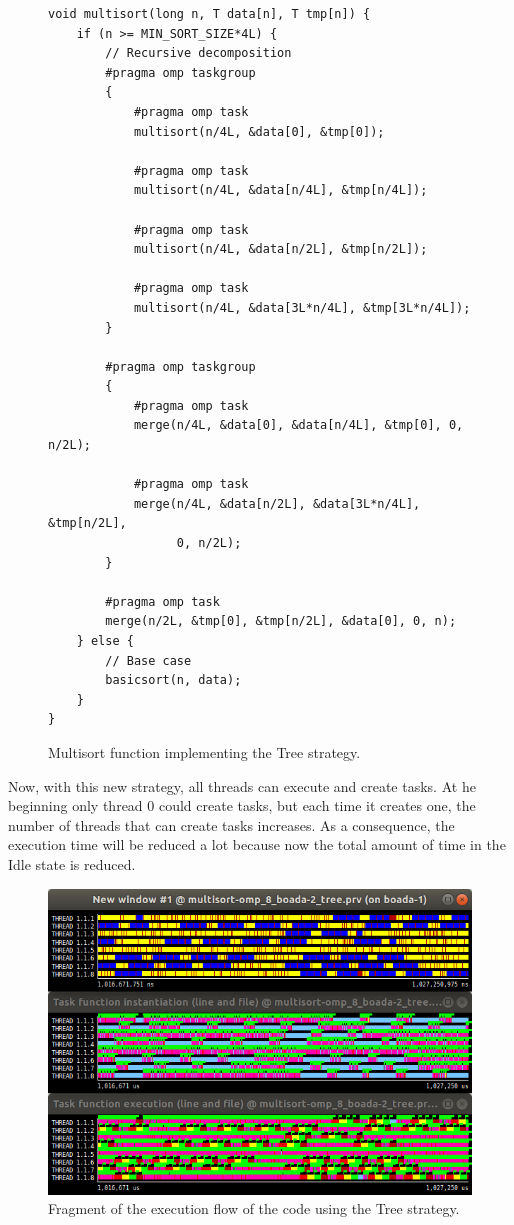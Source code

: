 \documentclass[12pt, a4paper]{article}
\begin{document}
\begin{figure}[H]
\begin{lstlisting}
void multisort(long n, T data[n], T tmp[n]) {
    if (n >= MIN_SORT_SIZE*4L) {
	    // Recursive decomposition
	    #pragma omp taskgroup
	    {
			#pragma omp task
			multisort(n/4L, &data[0], &tmp[0]);
			
			#pragma omp task
			multisort(n/4L, &data[n/4L], &tmp[n/4L]);
			
			#pragma omp task
			multisort(n/4L, &data[n/2L], &tmp[n/2L]);
			
			#pragma omp task
			multisort(n/4L, &data[3L*n/4L], &tmp[3L*n/4L]);
		}
	
		#pragma omp taskgroup
		{
			#pragma omp task
			merge(n/4L, &data[0], &data[n/4L], &tmp[0], 0, n/2L);
			
			#pragma omp task
			merge(n/4L, &data[n/2L], &data[3L*n/4L], &tmp[n/2L],
				  0, n/2L);
		}
		
		#pragma omp task
	    merge(n/2L, &tmp[0], &tmp[n/2L], &data[0], 0, n);
	} else {
		// Base case
		basicsort(n, data);
	}
}
\end{lstlisting}

\caption{Multisort function implementing the Tree strategy.}
\end{figure}

Now, with this new strategy, all threads can execute and create tasks. At he beginning only thread 0 could create tasks, but each time it creates one, the number of threads that can create tasks increases. As a consequence, the execution time will be reduced a lot because now the total amount of time in the Idle state is reduced.

\begin{figure}[H]
	\centering
	\includegraphics[scale=0.45]{./images/S2/Tree_paraver}
	
	\label{fig:tree_traces}
	\caption{Fragment of the execution flow of the code using the Tree strategy.}
\end{figure}
\end{document}
